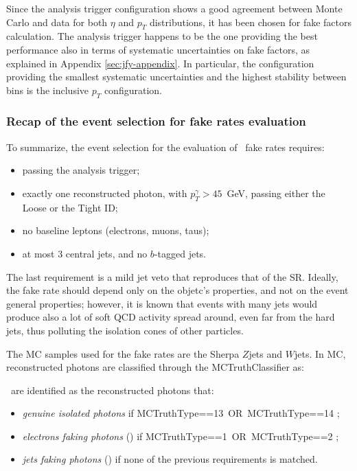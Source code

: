 Since the analysis trigger configuration shows a good agreement between Monte Carlo and data for both $\eta$ and $p_T$ distributions, it has been chosen for fake factors calculation. The analysis trigger happens to be the one providing the best performance also in terms of systematic uncertainties on fake factors, as explained in Appendix \ref{sec:jfy-appendix}. In particular, the configuration providing the smallest systematic uncertainties and the highest stability between bins is the inclusive $p_T$ configuration. 

\subsubsection{Recap of the event selection for fake rates evaluation}

To summarize, the event selection for the evaluation of \jfakey\ fake rates requires:
\begin{itemize}
\item passing the analysis trigger;
\item exactly one reconstructed photon, with $p_T^\gamma>45$~GeV, passing either the Loose or the Tight ID;
\item no baseline leptons (electrons, muons, taus);
\item at most 3 central jets, and no $b$-tagged jets.
\end{itemize}
The last requirement is a mild jet veto that reproduces that of the SR. Ideally, the fake rate should depend only on the objetc's properties, and not on the event general properties; however, it is known that events with many jets would produce also a lot of soft QCD activity spread around, even far from the hard jets, thus polluting the isolation cones of other particles.

The MC samples used for the fake rates are the Sherpa $Z$jets and $W$jets. In MC, reconstructed photons are classified through the MCTruthClassifier as:

\jfakey\ are identified  as the reconstructed photons that:
\begin{itemize}
\item {\em genuine isolated photons} if MCTruthType==13~OR~MCTruthType==14 ; 
\item {\em electrons faking photons} (\efakey) if MCTruthType==1~OR~MCTruthType==2 ; 
\item {\em jets faking photons} (\jfakey) if none of the previous requirements is matched.
\end{itemize}

